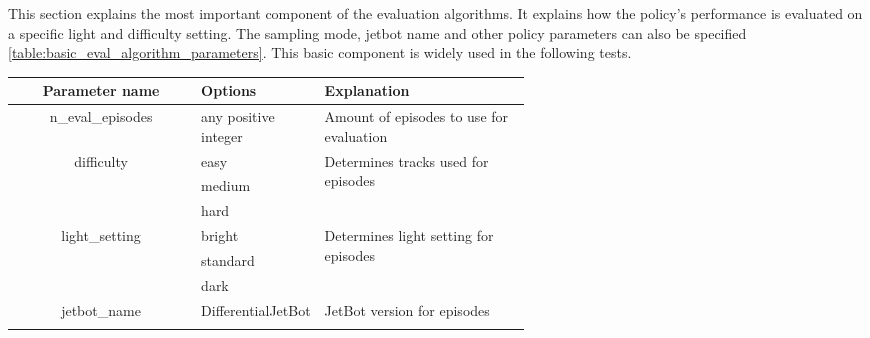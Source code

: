 This section explains the most important component of the evaluation algorithms. It explains how the policy's performance is evaluated on a specific light and difficulty setting. The sampling mode, jetbot name and other policy parameters can also be specified \ref{table:basic_eval_algorithm_parameters}. This basic component is widely used in the following tests.


\begin{table}
    \begin{center}
        \begin{tabular}{|| c | p{0.20\linewidth} | p{0.4\linewidth} ||}
            \hline
            Parameter name                     & Options              & Explanation                                                                                  \\ [0.5ex]
            \hline\hline
            \multirow{1}{*}{n\_eval\_episodes} & any positive integer & Amount of episodes to use for evaluation                                                     \\
            \hline
            \multirow{3}{*}{difficulty}        & easy                 & \multirow{3}{\linewidth}{Determines tracks used for episodes}                                \\\cline{2-2}
                                               & medium               &                                                                                              \\\cline{2-2}
                                               & hard                 &                                                                                              \\
            \hline
            \multirow{3}{*}{light\_setting}    & bright               & \multirow{3}{\linewidth}{Determines light setting for episodes}                              \\\cline{2-2}
                                               & standard             &                                                                                              \\\cline{2-2}
                                               & dark                 &                                                                                              \\
            \hline
            \multirow{2}{*}{jetbot\_name}      & DifferentialJetBot   & \multirow{2}{\linewidth}{JetBot version for episodes}                                        \\\cline{2-2}

\end{tabular}
\end{center}
\end{table}
